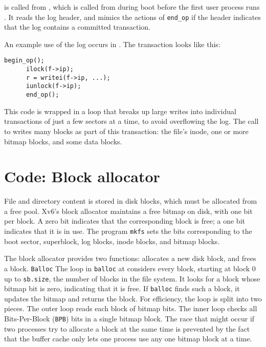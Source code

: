 is called from 
,
which is called from  during boot before the first user process runs
.
It reads the log header, and mimics the actions of
\lstinline{end_op}
if the header indicates that the log contains a committed transaction.

An example use of the log occurs in 
.
The transaction looks like this:
\begin{lstlisting}[]
      begin_op();
      ilock(f->ip);
      r = writei(f->ip, ...);
      iunlock(f->ip);
      end_op();
\end{lstlisting}
This code is wrapped in a loop that breaks up large writes into individual
transactions of just a few sectors at a time, to avoid overflowing
the log.  The call to
writes many blocks as part of this
transaction: the file's inode, one or more bitmap blocks, and some data
blocks.
\section{Code: Block allocator}

File and directory content is stored in disk blocks,
which must be allocated from a free pool.
Xv6's block allocator
maintains a free bitmap on disk, with one bit per block. 
A zero bit indicates that the corresponding block is free;
a one bit indicates that it is in use.
The program
\lstinline{mkfs}
sets the bits corresponding to the boot sector, superblock, log blocks, inode
blocks, and bitmap blocks.

The block allocator provides two functions:
allocates a new disk block, and
frees a block.
\lstinline{Balloc}
The loop in
\lstinline{balloc}
at
considers every block, starting at block 0 up to 
\lstinline{sb.size},
the number of blocks in the file system.
It looks for a block whose bitmap bit is zero,
indicating that it is free.
If
\lstinline{balloc}
finds such a block, it updates the bitmap 
and returns the block.
For efficiency, the loop is split into two 
pieces.
The outer loop reads each block of bitmap bits.
The inner loop checks all 
Bits-Per-Block (\lstinline{BPB})
bits in a single bitmap block.
The race that might occur if two processes try to allocate
a block at the same time is prevented by the fact that
the buffer cache only lets one process use any one bitmap block at a time.

